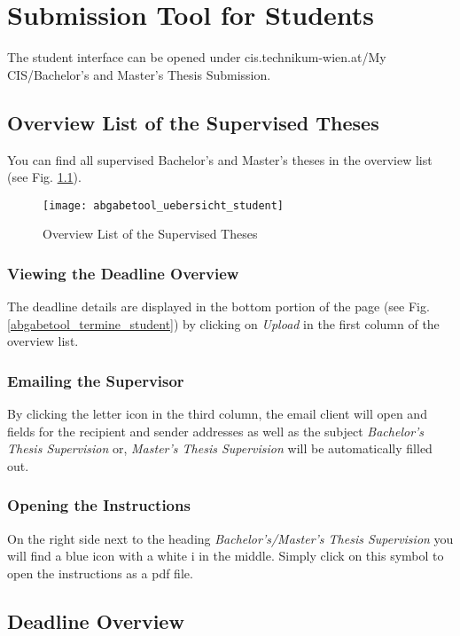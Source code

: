 \chapter{Submission Tool for Students}
\label{Kapitel Aufruf}
The student interface can be opened under cis.technikum-wien.at/My CIS/Bachelor's and Master's Thesis Submission.

\section{Overview List of the Supervised Theses}
You can find all supervised Bachelor's and Master's theses in the overview list (see Fig. \ref{abgabetool_uebersicht_student}).

\begin {figure}
	\centering
	\texttt{[image: abgabetool\_uebersicht\_student]}
	\caption{Overview List of the Supervised Theses}
	\label{abgabetool_uebersicht_student}
\end {figure}

\subsection{Viewing the Deadline Overview}
The deadline details are displayed in the bottom portion of the page (see Fig. \ref{abgabetool_termine_student}) by clicking on \textit{Upload} in the first column of the overview list.

\subsection{Emailing the Supervisor}
By clicking the letter icon in the third column, the email client will open and fields for the recipient and sender addresses as well as the subject \textit{Bachelor's Thesis Supervision} or, \textit{Master's Thesis Supervision} will be automatically filled out.

\subsection{Opening the Instructions}
On the right side next to the heading \textit{Bachelor's/Master's Thesis Supervision} you will find a blue icon with a white i in the middle. Simply click on this symbol to open the instructions as a pdf file.

\section{Deadline Overview}


